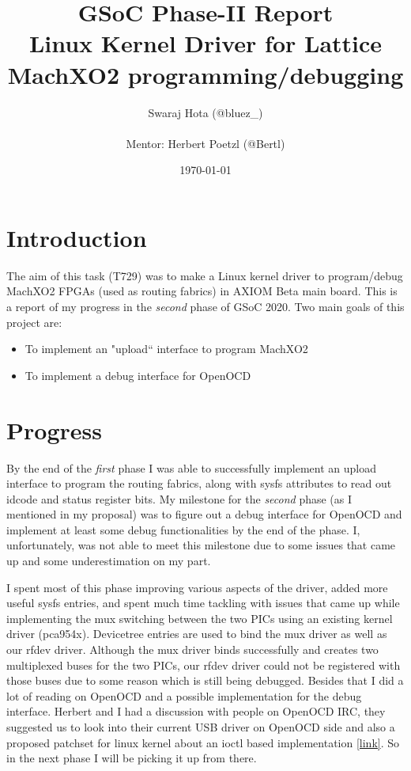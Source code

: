 \documentclass{article}
\title{{\Huge GSoC Phase-II Report} \\
{\vfill\huge Linux Kernel Driver for Lattice MachXO2 programming/debugging}}
\author{Swaraj Hota (@bluez\_) \\
\\Mentor: Herbert Poetzl (@Bertl)}
\date{\vfill\today}
\begin{document}
 
\selectfont
\maketitle 
\newpage
\tableofcontents
\newpage

\section{Introduction}
The aim of this task (T729) was to make a Linux kernel driver to program/debug
MachXO2 FPGAs (used as routing fabrics) in AXIOM Beta main board. This is a
report of my progress in
the \emph{second} phase of GSoC 2020.\newline
Two main goals of this project are:
\begin{itemize}
\item To implement an "upload`` interface to program MachXO2
\item To implement a debug interface for OpenOCD
\end{itemize}

\section{Progress}
By the end of the \emph{first} phase I was able to successfully implement an
upload interface to program the routing fabrics, along with sysfs attributes to
read out idcode and status register bits. 
My milestone for the \emph{second} phase (as I mentioned in my proposal) was to
figure out a debug interface for OpenOCD and implement at least some debug
functionalities by the end of the phase.
I, unfortunately, was not able to meet this milestone due to some issues that
came up and some underestimation on my part.\newline

I spent most of this phase improving various aspects of the driver, added more
useful sysfs entries, and spent much time tackling with issues that came up while 
implementing the mux switching between the two PICs using an existing kernel
driver (pca954x). Devicetree entries are used to bind the mux driver as well as
our rfdev driver. Although the mux driver binds successfully and creates two
multiplexed buses for the two PICs, our rfdev driver could not be registered
with those buses due to some reason which is still being debugged. Besides that
I did a lot of reading on OpenOCD and a possible implementation for the debug
interface. Herbert and I had a discussion with people on OpenOCD IRC, they suggested
us to look into their current USB driver on OpenOCD side and also a proposed
patchset for linux kernel about an ioctl based implementation 
\href{https://lore.kernel.org/patchwork/cover/874787/}{[link]}. So in the next
phase I will be picking it up from there.\newline
\end{document}
